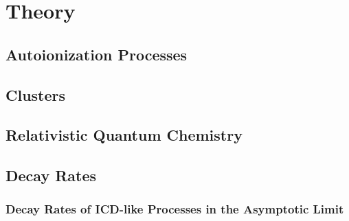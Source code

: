 \chapter{Theory}

\section{Autoionization Processes}
\section{Clusters}
\section{Relativistic Quantum Chemistry}
 
\section{Decay Rates}
\subsection{Decay Rates of ICD-like Processes in the Asymptotic Limit}

